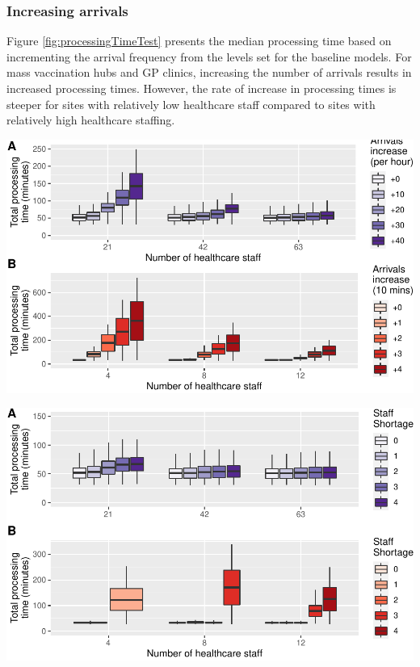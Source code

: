\documentclass{article}
\let\origfigure\figure
\let\endorigfigure\endfigure
\renewenvironment{figure}[1][2] {
    \expandafter\origfigure\expandafter[H]
} {
    \endorigfigure
}
\begin{document}
\hypertarget{increasing-arrivals}{%
\subsubsection{Increasing arrivals}\label{increasing-arrivals}}

Figure \ref{fig:processingTimeTest} presents the median processing time
based on incrementing the arrival frequency from the levels set for the
baseline models. For mass vaccination hubs and GP clinics, increasing
the number of arrivals results in increased processing times. However,
the rate of increase in processing times is steeper for sites with
relatively low healthcare staff compared to sites with relatively high
healthcare staffing.

\begin{figure}

{\centering \includegraphics{Preprint_files/figure-latex/processingTimeTest-1} 

}

\caption{Increase in processing time with increased arrivals by site size for mass vaccination hubs (A) and GP vaccination clinics (B)}\label{fig:processingTimeTest}
\end{figure}

\begin{figure}

{\centering \includegraphics{Preprint_files/figure-latex/staffShortageTest-1} 

}

\caption{Increase in processing time with staff shortages by site size}\label{fig:staffShortageTest}
\end{figure}
\end{document}
